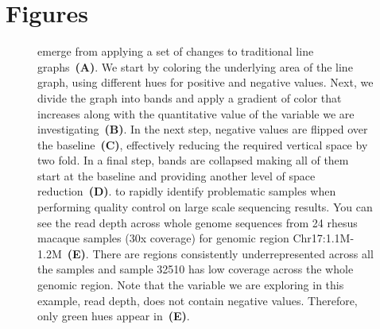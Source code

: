 \documentclass[twocolumn]{bmcart}
\begin{document}
\section*{Figures}
\begin{figure}[h!]

\caption{  emerge from applying a set of changes to
traditional line graphs~\textbf{(A)}. We start by coloring the underlying area
of the line graph, using different hues for positive and negative values. Next,
we divide the graph into bands and apply a gradient of color that increases
along with the quantitative value of the variable we are
investigating~\textbf{(B)}. In the next step, negative values are flipped over
the baseline~\textbf{(C)}, effectively reducing the required vertical space by
two fold. In a final step, bands are collapsed making all of them start at the
baseline and providing another level of space reduction~\textbf{(D)}.
 to rapidly identify problematic samples when
performing quality control on large scale sequencing results.  You can see the
read depth across whole genome sequences from 24 rhesus macaque samples (30x
coverage) for genomic region Chr17:1.1M-1.2M~\textbf{(E)}.  There are regions
consistently underrepresented across all the samples and sample 32510 has low
coverage across the whole genomic region.  Note that the variable we are
exploring in this example, read depth, does not contain negative values.
Therefore, only green hues appear in~\textbf{(E)}.  }\label{fig:01}

\end{figure}




\end{document}
